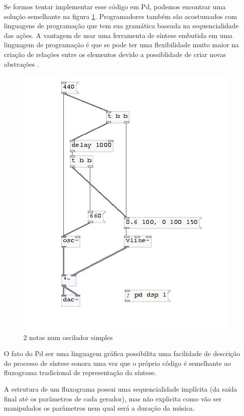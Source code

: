 \documentclass{ppgmus}
\begin{document}
Se formos tentar implementar esse código em Pd, podemos encontrar uma 
solução semelhante na figura \ref{fig:exemplopd1}.
Programadores também são acostumados com linguagens de programação que
tem sua gramática baseada na sequencialidade das ações. A vantagem de
usar uma ferramenta de síntese embutida em uma linguagem de
programação é que se pode ter uma flexibilidade muito maior na criação de
relações entre os elementos devido a possiblidade de criar novas
abstrações \cite{geiger2005}. 
 
\begin{figure}
  \centering
  \includegraphics[scale=.5]{exemplopd1}
  \caption{2 notas num oscilador simples}
  \label{fig:exemplopd1}
\end{figure}

O fato do Pd ser uma linguagem gráfica possibilita uma facilidade de
descrição do processo de síntese sonora uma vez que o próprio
código é semelhante ao fluxograma tradicional de representação da
síntese.

 A estrutura de um fluxograma
possui uma sequencialidade implícita (da saída final até os parâmetros
de cada gerador), mas não explicita como vão ser manipulados os
parâmetros nem qual será a duração da música.
\end{document}
